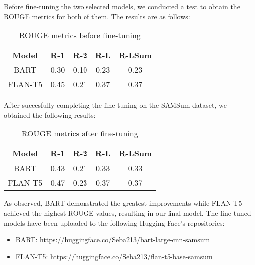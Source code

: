 \documentclass[10pt,twocolumn,letterpaper]{article}
\begin{document}
Before fine-tuning the two selected models, we conducted a test to obtain the ROUGE metrics for both of them.
The results are as follows:
\FloatBarrier
\begin{table}[h!]
    \centering
    \begin{tabular}{|c|c|c|c|c|}
        \hline
        \rowcolor{lightergray}
        Model & R-1 & R-2 & R-L & R-LSum \\ 
        \hline
        BART & 0.30 & 0.10 & 0.23 & 0.23\\
        FLAN-T5 & 0.45 & 0.21 & 0.37 & 0.37\\
        \hline
    \end{tabular}
    \caption{ROUGE metrics before fine-tuning}
    \label{table:ROUGEbeforeft}
\end{table}
\FloatBarrier \noindent 
After succesfully completing the fine-tuning on the SAMSum dataset, we obtained the following results:
\FloatBarrier
\begin{table}[h!]
    \centering
    \begin{tabular}{|c|c|c|c|c|}
        \hline
        \rowcolor{lightergray}
        Model & R-1 & R-2 & R-L & R-LSum \\ 
        \hline
        BART & 0.43 & 0.21 & 0.33 & 0.33\\
        FLAN-T5 & 0.47 & 0.23 & 0.37 & 0.37 \\
        \hline
    \end{tabular}
    \caption{ROUGE metrics after fine-tuning}
    \label{table:ROUGEafterft}
\end{table}
\FloatBarrier \noindent
As observed, BART demonstrated the greatest improvements while FLAN-T5 achieved the highest ROUGE values, resulting in our final model.
The fine-tuned models have been uploaded to the following Hugging Face's repositories:
\begin{itemize}
    \item BART: \url{https://huggingface.co/Seba213/bart-large-cnn-samsum}
    \item FLAN-T5: \url{https://huggingface.co/Seba213/flan-t5-base-samsum}
\end{itemize}
\end{document}
